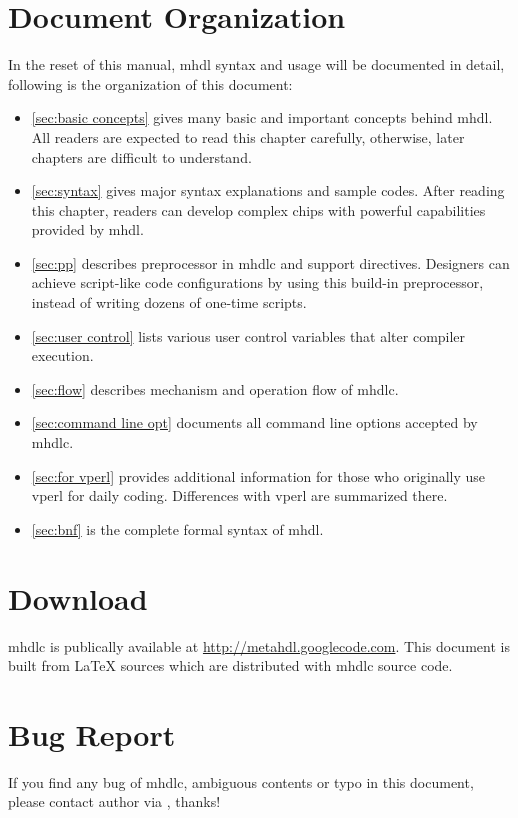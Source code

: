 \section{Document Organization}
In the reset of this manual, \gls{mhdl} syntax and usage will be
documented in detail, following is the organization of this document:
\begin{itemize}
\item \autoref{sec:basic concepts} gives many basic and important concepts
behind \gls{mhdl}. All readers are expected to read this chapter
carefully, otherwise, later chapters are difficult to understand.
\item \autoref{sec:syntax} gives major syntax explanations and sample codes. 
After reading this chapter, readers can develop complex chips with
powerful capabilities provided by \gls{mhdl}.
\item \autoref{sec:pp} describes preprocessor in \gls{mhdlc} and
  support directives. Designers can 
achieve script-like code configurations by using this build-in
preprocessor, instead of writing dozens of one-time scripts.
\item \autoref{sec:user control} lists various user control
  variables that alter compiler execution. 
\item \autoref{sec:flow} describes mechanism and operation flow of \gls{mhdlc}.
\item \autoref{sec:command line opt} documents all 
  command line options accepted by \gls{mhdlc}.
\item \autoref{sec:for vperl} provides additional information for those who originally use \gls{vperl}\cite{Yan2004}
for daily coding. Differences with \gls{vperl} are summarized there.
\item \autoref{sec:bnf} is the complete formal syntax of \gls{mhdl}.
\end{itemize}

\section{Download}
\gls{mhdlc} is publically available at \url{http://metahdl.googlecode.com}.
This document is built from \LaTeX{} sources which are distributed with \gls{mhdlc}
source code. 

\section{Bug Report}
If you find any bug of \gls{mhdlc}, ambiguous contents or typo in this
document, please contact author via
\href{mailto:\DocAuthor}{\DocAuthor}, thanks!



